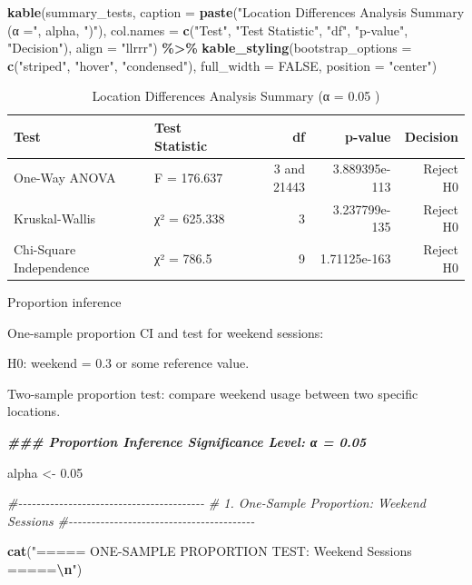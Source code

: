 \documentclass[
  12pt,
]{article}
\newenvironment{Shaded}{\begin{snugshade}}{\end{snugshade}}
\newcommand{\AttributeTok}[1]{\textcolor[rgb]{0.13,0.29,0.53}{#1}}
\newcommand{\CommentTok}[1]{\textcolor[rgb]{0.56,0.35,0.01}{\textit{#1}}}
\newcommand{\ConstantTok}[1]{\textcolor[rgb]{0.56,0.35,0.01}{#1}}
\newcommand{\DocumentationTok}[1]{\textcolor[rgb]{0.56,0.35,0.01}{\textbf{\textit{#1}}}}
\newcommand{\FloatTok}[1]{\textcolor[rgb]{0.00,0.00,0.81}{#1}}
\newcommand{\FunctionTok}[1]{\textcolor[rgb]{0.13,0.29,0.53}{\textbf{#1}}}
\newcommand{\NormalTok}[1]{#1}
\newcommand{\OtherTok}[1]{\textcolor[rgb]{0.56,0.35,0.01}{#1}}
\newcommand{\SpecialCharTok}[1]{\textcolor[rgb]{0.81,0.36,0.00}{\textbf{#1}}}
\newcommand{\StringTok}[1]{\textcolor[rgb]{0.31,0.60,0.02}{#1}}
\begin{document}
\begin{Shaded}
\begin{Highlighting}[]
\FunctionTok{kable}\NormalTok{(summary\_tests, }\AttributeTok{caption =} \FunctionTok{paste}\NormalTok{(}\StringTok{"Location Differences Analysis Summary (α ="}\NormalTok{,}
\NormalTok{    alpha, }\StringTok{")"}\NormalTok{), }\AttributeTok{col.names =} \FunctionTok{c}\NormalTok{(}\StringTok{"Test"}\NormalTok{, }\StringTok{"Test Statistic"}\NormalTok{, }\StringTok{"df"}\NormalTok{,}
    \StringTok{"p{-}value"}\NormalTok{, }\StringTok{"Decision"}\NormalTok{), }\AttributeTok{align =} \StringTok{"llrrr"}\NormalTok{) }\SpecialCharTok{\%\textgreater{}\%}
    \FunctionTok{kable\_styling}\NormalTok{(}\AttributeTok{bootstrap\_options =} \FunctionTok{c}\NormalTok{(}\StringTok{"striped"}\NormalTok{, }\StringTok{"hover"}\NormalTok{, }\StringTok{"condensed"}\NormalTok{),}
        \AttributeTok{full\_width =} \ConstantTok{FALSE}\NormalTok{, }\AttributeTok{position =} \StringTok{"center"}\NormalTok{)}
\end{Highlighting}
\end{Shaded}

\begin{longtable}[t]{llrrr}
\caption{\label{tab:unnamed-chunk-15}Location Differences Analysis Summary (α = 0.05 )}\\
\toprule
Test & Test Statistic & df & p-value & Decision\\
\midrule
One-Way ANOVA & F = 176.637 & 3 and 21443 & 3.889395e-113 & Reject H0\\
Kruskal-Wallis & χ² = 625.338 & 3 & 3.237799e-135 & Reject H0\\
Chi-Square Independence & χ² = 786.5 & 9 & 1.71125e-163 & Reject H0\\
\bottomrule
\end{longtable}

Proportion inference

One-sample proportion CI and test for weekend sessions:

H0: weekend = 0.3 or some reference value.

Two-sample proportion test: compare weekend usage between two specific
locations.

\begin{Shaded}
\begin{Highlighting}[]
\DocumentationTok{\#\#\# Proportion Inference Significance Level: α = 0.05}

\NormalTok{alpha }\OtherTok{\textless{}{-}} \FloatTok{0.05}

\CommentTok{\#{-}{-}{-}{-}{-}{-}{-}{-}{-}{-}{-}{-}{-}{-}{-}{-}{-}{-}{-}{-}{-}{-}{-}{-}{-}{-}{-}{-}{-}{-}{-}{-}{-}{-}{-}{-}{-}{-}{-}{-}{-}}
\CommentTok{\# 1. One{-}Sample Proportion: Weekend Sessions}
\CommentTok{\#{-}{-}{-}{-}{-}{-}{-}{-}{-}{-}{-}{-}{-}{-}{-}{-}{-}{-}{-}{-}{-}{-}{-}{-}{-}{-}{-}{-}{-}{-}{-}{-}{-}{-}{-}{-}{-}{-}{-}{-}{-}}

\FunctionTok{cat}\NormalTok{(}\StringTok{"===== ONE{-}SAMPLE PROPORTION TEST: Weekend Sessions =====}\SpecialCharTok{\textbackslash{}n}\StringTok{"}\NormalTok{)}
\end{Highlighting}
\end{Shaded}
\end{document}

